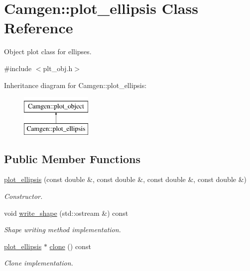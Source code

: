 \hypertarget{a00428}{}\section{Camgen\+:\+:plot\+\_\+ellipsis Class Reference}
\label{a00428}


Object plot class for ellipses.  




{\ttfamily \#include $<$plt\+\_\+obj.\+h$>$}

Inheritance diagram for Camgen\+:\+:plot\+\_\+ellipsis\+:\begin{figure}[H]
\begin{center}
\leavevmode
\includegraphics[height=2.000000cm]{a00428}
\end{center}
\end{figure}
\subsection*{Public Member Functions}
\begin{DoxyCompactItemize}
\item 
\hypertarget{a00428_aef608d16271b3974d72729c2017a6ca4}{}\hyperlink{a00428_aef608d16271b3974d72729c2017a6ca4}{plot\+\_\+ellipsis} (const double \&, const double \&, const double \&, const double \&)\label{a00428_aef608d16271b3974d72729c2017a6ca4}

\begin{DoxyCompactList}\small\item\em Constructor. \end{DoxyCompactList}\item 
\hypertarget{a00428_a2f7ec9ba40fdbbd7dc48946798051671}{}void \hyperlink{a00428_a2f7ec9ba40fdbbd7dc48946798051671}{write\+\_\+shape} (std\+::ostream \&) const \label{a00428_a2f7ec9ba40fdbbd7dc48946798051671}

\begin{DoxyCompactList}\small\item\em Shape writing method implementation. \end{DoxyCompactList}\item 
\hypertarget{a00428_ae7012c8c0888b5941d69ab1da42eee6b}{}\hyperlink{a00428}{plot\+\_\+ellipsis} $\ast$ \hyperlink{a00428_ae7012c8c0888b5941d69ab1da42eee6b}{clone} () const \label{a00428_ae7012c8c0888b5941d69ab1da42eee6b}

\begin{DoxyCompactList}\small\item\em Clone implementation. \end{DoxyCompactList}\end{DoxyCompactItemize}
